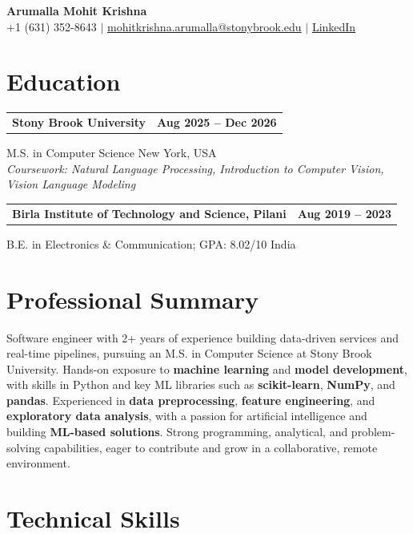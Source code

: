 \documentclass[letterpaper,10pt]{article}
\makeatletter
\newcommand{\entry}[2]{%
  \noindent
  \begin{tabularx}{\linewidth}
    {@{}>{\raggedright\arraybackslash}X@{\hspace{6pt}}r@{}}
    \textbf{#1} & #2
  \end{tabularx}\par
}
\makeatother
\begin{document}
\begin{center}
    {\LARGE\bfseries Arumalla Mohit Krishna}\\[3pt]
    +1 (631) 352-8643 $|$
    \href{mailto:mohitkrishna.arumalla@stonybrook.edu}
    {mohitkrishna.arumalla@stonybrook.edu} $|$
    \href{https://linkedin.com/in/mohit-krishna-arumalla}
    {LinkedIn}
\end{center}
\vspace{-8pt}

\section{Education}

\entry
  {\textbf{Stony Brook University}}
  {\textbf{Aug 2025 -- Dec 2026}}

M.S. in Computer Science \hfill New York, USA\\
\textit{
Coursework: Natural Language Processing,
Introduction to Computer Vision, Vision Language Modeling
}
\vspace{3pt}

\entry
  {\textbf{Birla Institute of Technology and Science, Pilani}}
  {\textbf{Aug 2019 -- 2023}}

B.E. in Electronics \& Communication; GPA: 8.02/10 \hfill India
\section{Professional Summary}

Software engineer with 2+ years of experience building data-driven services and real-time pipelines, pursuing an M.S. in Computer Science at Stony Brook University. Hands-on exposure to \textbf{machine learning} and \textbf{model development}, with skills in Python and key ML libraries such as \textbf{scikit-learn}, \textbf{NumPy}, and \textbf{pandas}. Experienced in \textbf{data preprocessing}, \textbf{feature engineering}, and \textbf{exploratory data analysis}, with a passion for artificial intelligence and building \textbf{ML-based solutions}. Strong programming, analytical, and problem-solving capabilities, eager to contribute and grow in a collaborative, remote environment.

\section{Technical Skills}
\end{document}
